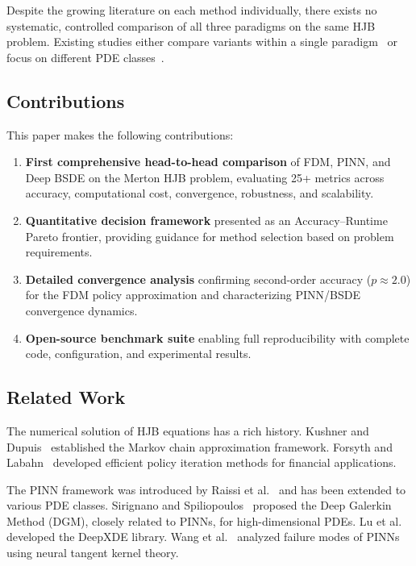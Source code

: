 \documentclass[12pt,a4paper]{article}
\begin{document}
Despite the growing literature on each method individually, there exists no systematic, controlled comparison of all three paradigms on the same HJB problem. Existing studies either compare variants within a single paradigm~\cite{bachouch2022} or focus on different PDE classes~\cite{mazur2022}.

\subsection{Contributions}

This paper makes the following contributions:

\begin{enumerate}
    \item \textbf{First comprehensive head-to-head comparison} of FDM, PINN, and Deep BSDE on the Merton HJB problem, evaluating 25+ metrics across accuracy, computational cost, convergence, robustness, and scalability.
    
    \item \textbf{Quantitative decision framework} presented as an Accuracy--Runtime Pareto frontier, providing guidance for method selection based on problem requirements.
    
    \item \textbf{Detailed convergence analysis} confirming second-order accuracy ($p \approx 2.0$) for the FDM policy approximation and characterizing PINN/BSDE convergence dynamics.
    
    \item \textbf{Open-source benchmark suite} enabling full reproducibility with complete code, configuration, and experimental results.
\end{enumerate}

\subsection{Related Work}

The numerical solution of HJB equations has a rich history. Kushner and Dupuis~\cite{kushner2001} established the Markov chain approximation framework. Forsyth and Labahn~\cite{forsyth2005} developed efficient policy iteration methods for financial applications.

The PINN framework was introduced by Raissi et al.~\cite{raissi2019} and has been extended to various PDE classes. Sirignano and Spiliopoulos~\cite{sirignano2018} proposed the Deep Galerkin Method (DGM), closely related to PINNs, for high-dimensional PDEs. Lu et al.~\cite{lu2021} developed the DeepXDE library. Wang et al.~\cite{wang2022} analyzed failure modes of PINNs using neural tangent kernel theory.
\end{document}
